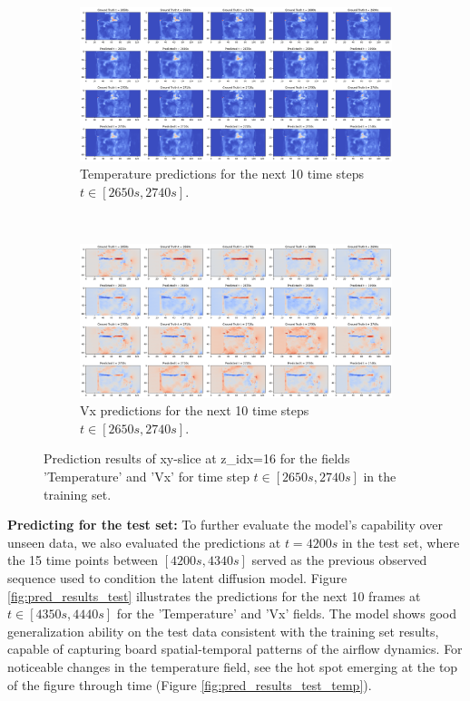 \documentclass[final-report]{article-template}
\begin{document}
\begin{figure}[!htb]
    \centering
    \begin{subfigure}[t]{0.99\textwidth}
        \centering
        \includegraphics[width=\textwidth]{figures/temp_10_2650.png}
        \caption{Temperature predictions for the next 10 time steps $t \in [2650s, 2740s]$.}
    \end{subfigure} \\[8mm]
    \begin{subfigure}[t]{0.99\textwidth}
        \centering
        \includegraphics[width=\textwidth]{figures/vx_10_2650.png}
        \caption{Vx predictions for the next 10 time steps $t \in [2650s, 2740s]$.}
    \end{subfigure}
    \caption{Prediction results of xy-slice at z\_idx=16 for the fields 'Temperature' and 'Vx' for time step $t \in [2650s, 2740s]$ in the training set.}
    \label{fig:pred_results_training}
\end{figure}
\textbf{Predicting for the test set:} To further evaluate the model's capability over unseen data, we also evaluated the predictions at $t = 4200s$ in the test set, where the 15 time points between $[4200s, 4340s]$ served as the previous observed sequence used to condition the latent diffusion model. Figure \ref{fig:pred_results_test} illustrates the predictions for the next 10 frames at $t \in [4350s, 4440s]$ for the 'Temperature' and 'Vx' fields. The model shows good generalization ability on the test data consistent with the training set results, capable of capturing board spatial-temporal patterns of the airflow dynamics. For noticeable changes in the temperature field, see the hot spot emerging at the top of the figure through time (Figure \ref{fig:pred_results_test_temp}). 
\end{document}
